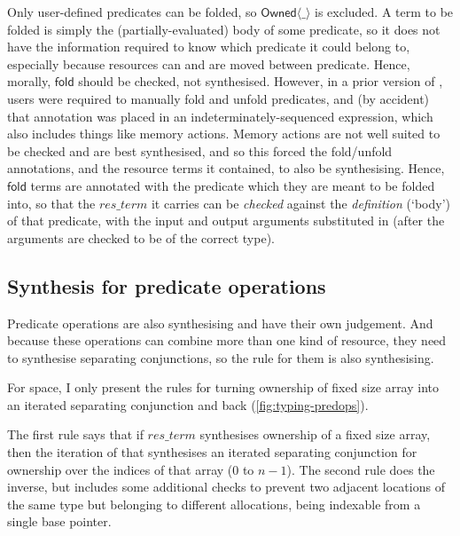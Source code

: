 Only user-defined predicates can be folded, so $\mathsf{Owned}\langle\_\rangle$
is excluded. A term to
be folded is simply the (partially-evaluated) body of some predicate, so it
does not have the information required to know which predicate it could belong
to, especially because resources can and are moved between predicate. Hence,
morally, $\mathsf{fold}$ should be checked, not synthesised. However, in a
prior version of , users were required to manually fold and unfold
predicates, and (by accident) that annotation was placed in an
indeterminately-sequenced expression, which also includes things like memory
actions. Memory actions are not well suited to be checked and are best
synthesised, and so this forced the fold/unfold annotations, and the resource
terms it contained, to also be synthesising. Hence, $\mathsf{fold}$ terms are annotated with the predicate which
they are meant to be folded into, so that the $\mathit{res\_term}$ it carries
can be \emph{checked} against the \emph{definition} (`body') of that predicate,
with the input and output arguments substituted in (after the arguments
are checked to be of the correct type).

\subsection{Synthesis for predicate operations}

Predicate operations are also synthesising and have their own judgement. And
because these operations can combine more than one kind of resource, they need
to synthesise separating conjunctions, so the rule for them is also
synthesising.

For space, I only present the rules for turning ownership of fixed size array
into an iterated separating conjunction and back (\cref{fig:typing-predops}).

The first rule says that if $\mathit{res\_term}$ synthesises ownership of a
fixed size array, then the iteration of that synthesises an iterated separating
conjunction for ownership over the indices of that array ($0$ to
$n-1$). The second rule does the
inverse, but includes some additional checks to prevent two adjacent locations
of the same type but belonging to different allocations, being indexable from
a single base pointer.

